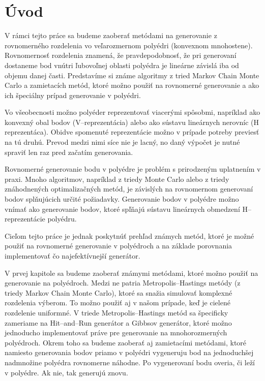 \chapter*{Úvod} %

V rámci tejto práce sa budeme zaoberať metódami na generovanie z rovnomerného rozdelenia vo veľarozmernom polyédri (konvexnom mnohostene). Rovnomernosť rozdelenia znamená, že pravdepodobnosť, že pri generovaní dostaneme bod vnútri ľubovoľnej oblasti polyédra je lineárne závislá iba od objemu danej časti. Predstavíme si známe algoritmy z tried Markov Chain Monte Carlo a zamietacích metód, ktoré možno použiť na rovnomerné generovanie a ako ich špeciálny prípad generovanie v polyédri. 

Vo všeobecnosti možno polyéder reprezentovať viacerými spôsobmi, napríklad ako konvexný obal bodov (V--reprezentácia) alebo ako sústavu lineárnych nerovníc (H reprezentáca). Obidve spomenuté reprezentácie možno v prípade potreby previesť na tú druhú. Prevod medzi nimi síce nie je lacný, no daný výpočet je nutné spraviť len raz pred začatím generovania. 

Rovnomerné generovanie bodu v polyédre je problém s prirodzeným uplatnením v praxi. Mnoho algoritmov, napríklad z triedy Monte Carlo alebo z triedy znáhodnených optimalizačných metód, je závislých na rovnomernom generovaní bodov splňujúcich určité požiadavky.
Generovanie bodov v polyédre možno vnímať ako generovanie bodov, ktoré spľňajú sústavu lineárnych obmedzení H--reprezentácie polyédru.

Cieľom tejto práce je jednak poskytnúť prehľad známych metód, ktoré je možné použiť na rovnomerné generovanie v polyédroch a na základe porovnania implementovať čo najefektívnejší generátor.

V prvej kapitole sa budeme zaoberať známymi metódami, ktoré možno použiť na generovanie na polyédroch. Medzi ne patria Metropolis--Hastings metódy (z triedy Markov Chain Monte Carlo), ktoré sa snažia simulovať komplexné rozdelenia výberom. To možno použiť aj v našom prípade, keď je cielené rozdelenie uniformné. V triede Metropolis--Hastings metód sa špecificky zameriame na Hit--and--Run generátor a Gibbsov generátor, ktoré možno jednoducho implementovať práve pre generovanie na mnohorozmerných polyédroch.
Okrem toho sa budeme zaoberať aj zamietacími metódami, ktoré namiesto generovania bodov priamo v polyédri vygeneruju bod na jednoduchšej nadmnožine polyédra rovnomerne náhodne. Po vygenerovaní bodu overia, či leží v polyédre. Ak nie, tak generujú znovu.

